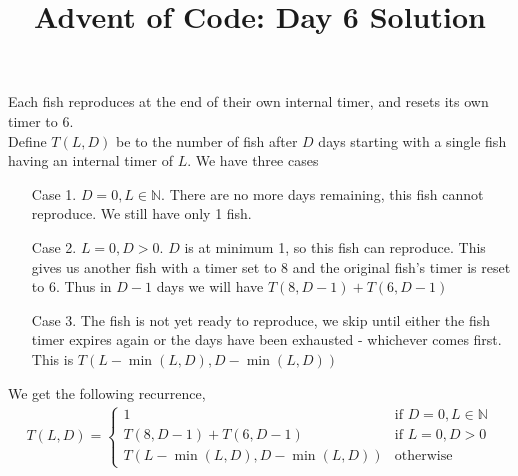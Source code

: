 \documentclass{article}
\title{Advent of Code: Day 6 Solution}
\date{}
\begin{document}
\maketitle
\noindent Each fish reproduces at the end of their own internal timer, and
resets its own timer to 6.\\

\noindent Define \(T(L,D)\) be to the number of fish after \(D\) days
starting with a single fish having an internal timer of \(L\). We have three
cases
\begin{enumerate}
    \item [Case 1.] \(D = 0, L \in \mathbb{N}\). There are no more days
          remaining, this fish cannot reproduce. We still have only 1 fish.
    \item [Case 2.] \(L = 0, D > 0\). \(D\) is at minimum 1, so this fish
          can reproduce. This gives us another fish with a timer set to 8 and the
          original fish's timer is reset to 6. Thus in \(D - 1\) days we will have
          \(T(8, D-1) + T(6, D - 1)\)
    \item [Case 3.] The fish is not yet ready to reproduce, we skip until
          either the fish timer expires again or the days have been exhausted -
          whichever comes first. This is \(T(L - \min(L,D), D - \min(L,D))\)
\end{enumerate}
We get the following recurrence,
\begin{eqnarray}
    T(L,D) = \begin{cases}
        1                               & \textrm{if } D = 0, L \in \mathbb{N} \\
        T(8, D - 1) + T(6, D - 1)       & \textrm{if } L = 0, D > 0            \\
        T(L - \min(L,D), D - \min(L,D)) & \textrm{otherwise}
    \end{cases}
\end{eqnarray}
\end{document}
